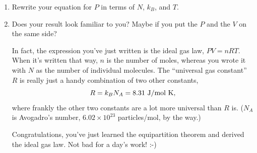 \begin{enumerate}[labparts]
\item Rewrite your equation for $P$ in terms of $N$, $k_B$, and $T$.  
\answerspace{0.5in}


\item Does your result look familiar to you?  Maybe if you put the $P$ and the $V$ on the same side?
\answerspace{0.5in}

In fact, the expression you've just written is the ideal gas law, $PV = nRT$.  When it's written that way, $n$ is the number of moles, whereas you wrote it with $N$ as the number of individual molecules.  The ``universal gas constant'' $R$ is really just a handy combination of two other constants, 
$$R =k_BN_A=8.31~{\rm J/mol ~K,}$$
where frankly the other two constants are a lot more universal than $R$ is.  ($N_A$ is Avogadro's number, $6.02 \times 10^{23}$ particles/mol, by the way.)

\medskip

Congratulations, you've just learned the equipartition theorem and derived the ideal gas law.  Not bad for a day's work! :-)

\end{enumerate}